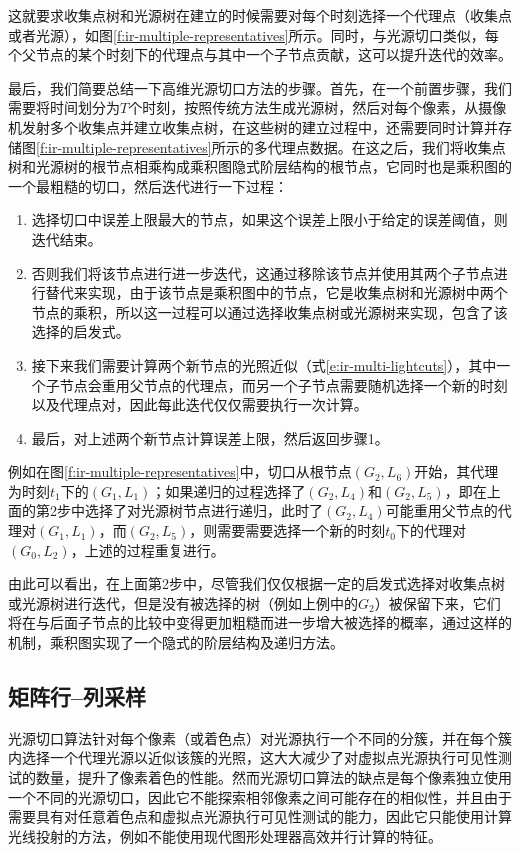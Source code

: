 这就要求收集点树和光源树在建立的时候需要对每个时刻选择一个代理点（收集点或者光源），如图\ref{f:ir-multiple-representatives}所示。同时，与光源切口类似，每个父节点的某个时刻下的代理点与其中一个子节点贡献，这可以提升迭代的效率。

最后，我们简要总结一下高维光源切口方法的步骤。首先，在一个前置步骤，我们需要将时间划分为$T$个时刻，按照传统方法生成光源树，然后对每个像素，从摄像机发射多个收集点并建立收集点树，在这些树的建立过程中，还需要同时计算并存储图\ref{f:ir-multiple-representatives}所示的多代理点数据。在这之后，我们将收集点树和光源树的根节点相乘构成乘积图隐式阶层结构的根节点，它同时也是乘积图的一个最粗糙的切口，然后迭代进行一下过程：

\begin{enumerate}
	\item 选择切口中误差上限最大的节点，如果这个误差上限小于给定的误差阈值，则迭代结束。
	\item 否则我们将该节点进行进一步迭代，这通过移除该节点并使用其两个子节点进行替代来实现，由于该节点是乘积图中的节点，它是收集点树和光源树中两个节点的乘积，所以这一过程可以通过选择收集点树或光源树来实现，\cite{a:MultidimensionalLightcuts}包含了该选择的启发式。
	\item 接下来我们需要计算两个新节点的光照近似（式\ref{e:ir-multi-lightcuts}），其中一个子节点会重用父节点的代理点，而另一个子节点需要随机选择一个新的时刻以及代理点对，因此每此迭代仅仅需要执行一次计算。
	\item 最后，对上述两个新节点计算误差上限，然后返回步骤1。
\end{enumerate}

例如在图\ref{f:ir-multiple-representatives}中，切口从根节点$(G_2,L_6)$开始，其代理为时刻$t_1$下的$(G_1,L_1)$；如果递归的过程选择了$(G_2,L_4)$和$(G_2,L_5)$，即在上面的第2步中选择了对光源树节点进行递归，此时了$(G_2,L_4)$可能重用父节点的代理对$(G_1,L_1)$，而$(G_2,L_5)$，则需要需要选择一个新的时刻$t_0$下的代理对$(G_0,L_2)$，上述的过程重复进行。

由此可以看出，在上面第2步中，尽管我们仅仅根据一定的启发式选择对收集点树或光源树进行迭代，但是没有被选择的树（例如上例中的$G_2$）被保留下来，它们将在与后面子节点的比较中变得更加粗糙而进一步增大被选择的概率，通过这样的机制，乘积图实现了一个隐式的阶层结构及递归方法。




\subsection{矩阵行--列采样}
光源切口算法针对每个像素（或着色点）对光源执行一个不同的分簇，并在每个簇内选择一个代理光源以近似该簇的光照，这大大减少了对虚拟点光源执行可见性测试的数量，提升了像素着色的性能。然而光源切口算法的缺点是每个像素独立使用一个不同的光源切口，因此它不能探索相邻像素之间可能存在的相似性，并且由于需要具有对任意着色点和虚拟点光源执行可见性测试的能力，因此它只能使用计算光线投射的方法，例如不能使用现代图形处理器高效并行计算的特征。


